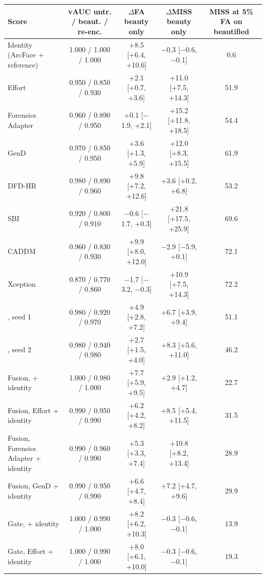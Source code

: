 \begin{tabular}{@{}l c c c c@{}}
\toprule
Score & vAUC untr. / beaut. / re-enc. & $\Delta$FA beauty only & $\Delta$MISS beauty only & MISS at 5\% FA on beautified \\
\midrule
Identity (ArcFace + reference) & 1.000 / 1.000 / 1.000 & +8.5 [+6.4, +10.6] & $-$0.3 [$-$0.6, $-$0.1] & 0.6 \\
Effort & 0.950 / 0.850 / 0.930 & +2.1 [+0.7, +3.6] & +11.0 [+7.5, +14.3] & 51.9 \\
Forensics Adapter & 0.960 / 0.890 / 0.950 & +0.1 [$-$1.9, +2.1] & +15.2 [+11.8, +18.5] & 54.4 \\
GenD & 0.970 / 0.850 / 0.950 & +3.6 [+1.3, +5.9] & +12.0 [+8.3, +15.5] & 61.9 \\
DFD-HR & 0.980 / 0.890 / 0.960 & +9.8 [+7.2, +12.6] & +3.6 [+0.2, +6.8] & 53.2 \\
SBI & 0.920 / 0.800 / 0.910 & $-$0.6 [$-$1.7, +0.3] & +21.8 [+17.5, +25.9] & 69.6 \\
CADDM & 0.960 / 0.830 / 0.930 & +9.9 [+8.0, +12.0] & $-$2.9 [$-$5.9, +0.1] & 72.1 \\
Xception & 0.870 / 0.770 / 0.860 & $-$1.7 [$-$3.2, $-$0.3] & +10.9 [+7.5, +14.3] & 72.2 \\
\midrule
\ours{}, seed 1 & 0.980 / 0.920 / 0.970 & +4.9 [+2.8, +7.2] & +6.7 [+3.9, +9.4] & 51.1 \\
\ours{}, seed 2 & 0.980 / 0.940 / 0.980 & +2.7 [+1.5, +4.0] & +8.3 [+5.6, +11.0] & 46.2 \\
\midrule
Fusion, \ours{} + identity & 1.000 / 0.980 / 1.000 & +7.7 [+5.9, +9.5] & +2.9 [+1.2, +4.7] & 22.7 \\
Fusion, Effort + identity & 0.990 / 0.950 / 0.990 & +6.2 [+4.2, +8.2] & +8.5 [+5.4, +11.5] & 31.5 \\
Fusion, Forensics Adapter + identity & 0.990 / 0.960 / 0.990 & +5.3 [+3.3, +7.4] & +10.8 [+8.2, +13.4] & 28.9 \\
Fusion, GenD + identity & 0.990 / 0.950 / 0.990 & +6.6 [+4.7, +8.4] & +7.2 [+4.7, +9.6] & 29.9 \\
Gate, \ours{} + identity & 1.000 / 0.990 / 1.000 & +8.2 [+6.2, +10.3] & $-$0.3 [$-$0.6, $-$0.1] & 13.9 \\
Gate, Effort + identity & 1.000 / 0.990 / 1.000 & +8.0 [+6.1, +10.0] & $-$0.3 [$-$0.6, $-$0.1] & 19.3 \\
\bottomrule
\end{tabular}
